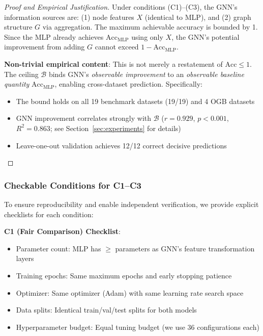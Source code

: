 \begin{proof}[Proof and Empirical Justification]
Under conditions (C1)--(C3), the GNN's information sources are: (1) node features $X$ (identical to MLP), and (2) graph structure $G$ via aggregation. The maximum achievable accuracy is bounded by 1. Since the MLP already achieves $\text{Acc}_{\text{MLP}}$ using only $X$, the GNN's potential improvement from adding $G$ cannot exceed $1 - \text{Acc}_{\text{MLP}}$.

\textbf{Non-trivial empirical content}: This is not merely a restatement of $\text{Acc} \leq 1$. The ceiling $\mathcal{B}$ binds GNN's \textit{observable improvement} to an \textit{observable baseline quantity} $\text{Acc}_{\text{MLP}}$, enabling cross-dataset prediction. Specifically:
\begin{itemize}
    \item The bound holds on all 19 benchmark datasets (19/19) and 4 OGB datasets
    \item GNN improvement correlates strongly with $\mathcal{B}$ ($r = 0.929$, $p < 0.001$, $R^2 = 0.863$; see Section~\ref{sec:experiments} for details)
    \item Leave-one-out validation achieves 12/12 correct decisive predictions
\end{itemize}
\end{proof}

\subsubsection{Checkable Conditions for C1--C3}
\label{sec:checklist}

To ensure reproducibility and enable independent verification, we provide explicit checklists for each condition:

\textbf{C1 (Fair Comparison) Checklist}:
\begin{itemize}
    \item[$\square$] Parameter count: MLP has $\geq$ parameters as GNN's feature transformation layers
    \item[$\square$] Training epochs: Same maximum epochs and early stopping patience
    \item[$\square$] Optimizer: Same optimizer (Adam) with same learning rate search space
    \item[$\square$] Data splits: Identical train/val/test splits for both models
    \item[$\square$] Hyperparameter budget: Equal tuning budget (we use 36 configurations each)
\end{itemize}

